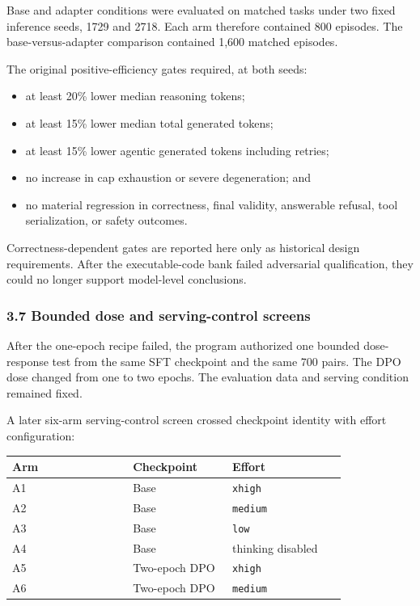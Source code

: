 \documentclass[
  9pt,
  letterpaper,
]{article}
\providecommand{\tightlist}{%
  \setlength{\itemsep}{0pt}\setlength{\parskip}{0pt}}
\begin{document}
Base and adapter conditions were evaluated on matched tasks under two
fixed inference seeds, 1729 and 2718. Each arm therefore contained 800
episodes. The base-versus-adapter comparison contained 1,600 matched
episodes.

The original positive-efficiency gates required, at both seeds:

\begin{itemize}
\tightlist
\item
  at least 20\% lower median reasoning tokens;
\item
  at least 15\% lower median total generated tokens;
\item
  at least 15\% lower agentic generated tokens including retries;
\item
  no increase in cap exhaustion or severe degeneration; and
\item
  no material regression in correctness, final validity, answerable
  refusal, tool serialization, or safety outcomes.
\end{itemize}

Correctness-dependent gates are reported here only as historical design
requirements. After the executable-code bank failed adversarial
qualification, they could no longer support model-level conclusions.

\hypertarget{37-bounded-dose-and-serving-control-screens}{%
\subsubsection{3.7 Bounded dose and serving-control
screens}\label{37-bounded-dose-and-serving-control-screens}}

After the one-epoch recipe failed, the program authorized one bounded
dose-response test from the same SFT checkpoint and the same 700 pairs.
The DPO dose changed from one to two epochs. The evaluation data and
serving condition remained fixed.

A later six-arm serving-control screen crossed checkpoint identity with
effort configuration:

\begin{longtable}[]{@{}p{0.34\linewidth}p{0.28\linewidth}p{0.32\linewidth}@{}}
\toprule\noalign{}
Arm & Checkpoint & Effort \\
\midrule\noalign{}
\endhead
\bottomrule\noalign{}
\endlastfoot
A1 & Base & \texttt{xhigh} \\
A2 & Base & \texttt{medium} \\
A3 & Base & \texttt{low} \\
A4 & Base & thinking disabled \\
A5 & Two-epoch DPO & \texttt{xhigh} \\
A6 & Two-epoch DPO & \texttt{medium} \\
\end{longtable}
\end{document}
